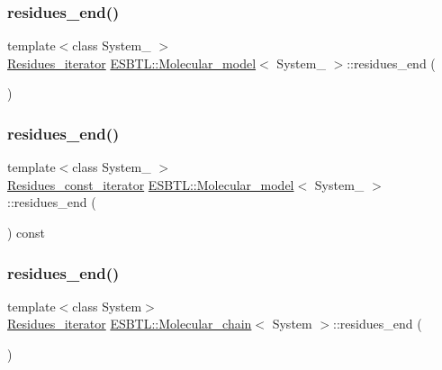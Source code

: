 \subsubsection{\texorpdfstring{residues\+\_\+end()}{residues\_end()}\hspace{0.1cm}{\footnotesize\ttfamily [1/4]}}
{\footnotesize\ttfamily template$<$class System\+\_\+ $>$ \\
\hyperlink{group__grp__iters_gae3b7c7057b27581b14109723b28a3abd}{Residues\+\_\+iterator} \hyperlink{classESBTL_1_1Molecular__model}{E\+S\+B\+T\+L\+::\+Molecular\+\_\+model}$<$ System\+\_\+ $>$\+::residues\+\_\+end (\begin{DoxyParamCaption}{ }\end{DoxyParamCaption})\hspace{0.3cm}{\ttfamily [inline]}}

\mbox{\label{group__grp__iters_ga20e41a3080eaa3bd0904651871c2a511}} 
\subsubsection{\texorpdfstring{residues\+\_\+end()}{residues\_end()}\hspace{0.1cm}{\footnotesize\ttfamily [2/4]}}
{\footnotesize\ttfamily template$<$class System\+\_\+ $>$ \\
\hyperlink{group__grp__iters_gab9417777a325c8ca02089328a4468703}{Residues\+\_\+const\+\_\+iterator} \hyperlink{classESBTL_1_1Molecular__model}{E\+S\+B\+T\+L\+::\+Molecular\+\_\+model}$<$ System\+\_\+ $>$\+::residues\+\_\+end (\begin{DoxyParamCaption}{ }\end{DoxyParamCaption}) const\hspace{0.3cm}{\ttfamily [inline]}}

\mbox{\label{group__grp__iters_gaee7c0abec465c6523f3095f2e2f6a8b8}} 
\subsubsection{\texorpdfstring{residues\+\_\+end()}{residues\_end()}\hspace{0.1cm}{\footnotesize\ttfamily [3/4]}}
{\footnotesize\ttfamily template$<$class System$>$ \\
\hyperlink{group__grp__iters_gaccad04117ad7c730e41bdb9aeab8f116}{Residues\+\_\+iterator} \hyperlink{classESBTL_1_1Molecular__chain}{E\+S\+B\+T\+L\+::\+Molecular\+\_\+chain}$<$ System $>$\+::residues\+\_\+end (\begin{DoxyParamCaption}{ }\end{DoxyParamCaption})\hspace{0.3cm}{\ttfamily [inline]}}

